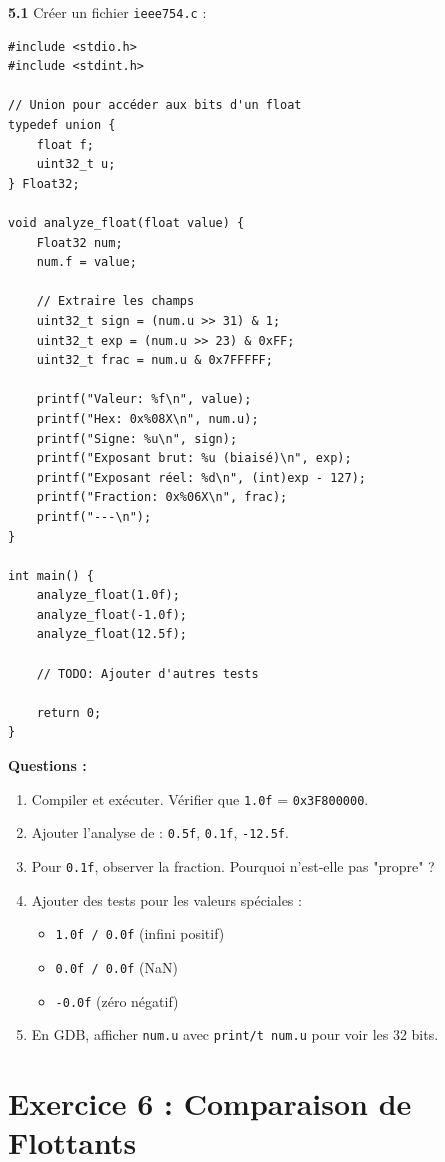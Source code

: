 \documentclass[10pt,a4paper]{article}
\begin{document}
\textbf{5.1} Créer un fichier \texttt{ieee754.c} :

\begin{lstlisting}
#include <stdio.h>
#include <stdint.h>

// Union pour accéder aux bits d'un float
typedef union {
    float f;
    uint32_t u;
} Float32;

void analyze_float(float value) {
    Float32 num;
    num.f = value;
    
    // Extraire les champs
    uint32_t sign = (num.u >> 31) & 1;
    uint32_t exp = (num.u >> 23) & 0xFF;
    uint32_t frac = num.u & 0x7FFFFF;
    
    printf("Valeur: %f\n", value);
    printf("Hex: 0x%08X\n", num.u);
    printf("Signe: %u\n", sign);
    printf("Exposant brut: %u (biaisé)\n", exp);
    printf("Exposant réel: %d\n", (int)exp - 127);
    printf("Fraction: 0x%06X\n", frac);
    printf("---\n");
}

int main() {
    analyze_float(1.0f);
    analyze_float(-1.0f);
    analyze_float(12.5f);
    
    // TODO: Ajouter d'autres tests
    
    return 0;
}
\end{lstlisting}

\textbf{Questions :}
\begin{enumerate}[label=\alph*)]
    \item Compiler et exécuter. Vérifier que \texttt{1.0f} = \texttt{0x3F800000}.
    \item Ajouter l'analyse de : \texttt{0.5f}, \texttt{0.1f}, \texttt{-12.5f}.
    \item Pour \texttt{0.1f}, observer la fraction. Pourquoi n'est-elle pas "propre" ?
    \item Ajouter des tests pour les valeurs spéciales :
    \begin{itemize}
        \item \texttt{1.0f / 0.0f} (infini positif)
        \item \texttt{0.0f / 0.0f} (NaN)
        \item \texttt{-0.0f} (zéro négatif)
    \end{itemize}
    \item En GDB, afficher \texttt{num.u} avec \texttt{print/t num.u} pour voir les 32 bits.
\end{enumerate}

\section{Exercice 6 : Comparaison de Flottants}
\end{document}
